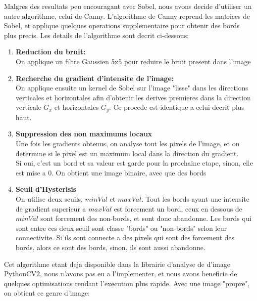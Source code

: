 \documentclass[a4paper, 12pt, titlepage, oneside]{article}
\begin{document}
	Malgres des resultats peu encouragant avec Sobel, nous avons decide d'utiliser un autre algorithme, celui de Canny. L'algorithme de Canny reprend les matrices de Sobel, et applique quelques operations supplementaire pour obtenir des bords plus precis. Les details de l'algorithme sont decrit ci-dessous:
	\begin{enumerate}
		\item \textbf{Reduction du bruit:}\\
			\indent On applique un filtre Gaussien 5x5 pour reduire le bruit present dans l'image
		\item \textbf{Recherche du gradient d'intensite de l'image:}\\  
			\indent On applique ensuite un kernel de Sobel sur l'image "lisse" dans les directions verticales et horizontales afin d'obtenir les derives premieres dans
			la direction verticale $G_x$ et horizontales $G_y$. Ce procede est identique a celui decrit plus haut.

		\item \textbf{Suppression des non maximums locaux}\\
			\indent Une fois les gradients obtenus, on analyse tout les pixels de l'image, et on determine si le pixel est un maximum local dans la
			direction du gradient. \\
			Si oui, c'est un bord et sa valeur est garde pour la prochaine etape, sinon, elle est mise a 0. On obtient une image binaire, avec que des bords

		\item \textbf{Seuil d'Hysterisis} \\
			\indent On utilise deux seuils, $minVal$ et $maxVal$. Tout les bords ayant une intensite de gradient superieur a $maxVal$ est forcement un
			bord, ceux en dessous de $minVal$ sont forcement des non-bords, et sont donc abandonne. Les bords qui sont entre ces deux seuil sont classe
			"bords" ou "non-bords" selon leur connectivite. Si ils sont connecte a des pixels qui sont des forcement des bords, alors ce sont des bords,
			sinon, ils sont aussi abandonne.\\

	\end{enumerate}
	Cet algorithme etant deja disponible dans la librairie d'analyse de d'image PythonCV2, nous n'avons pas eu a l'implementer, et nous avons beneficie de quelques optimisations rendant l'execution plus rapide.
	Avec une image "propre", on obtient ce genre d'image:\\
\end{document}
